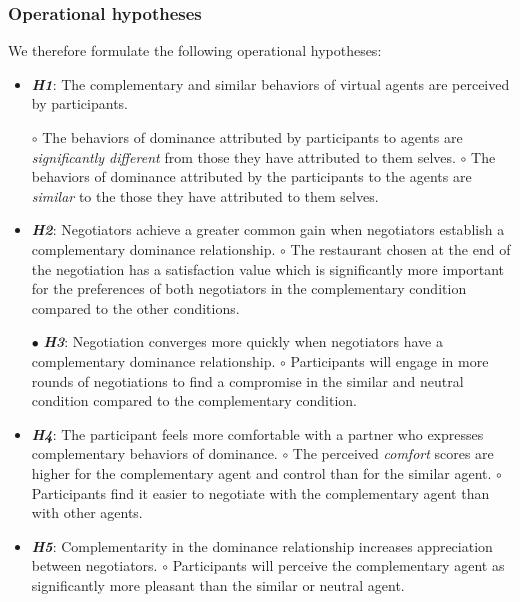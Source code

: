 \documentclass[10pt, a4paper]{article} %
\begin{document}
		\subsubsection{Operational hypotheses}
		We therefore formulate the following operational hypotheses:
		\begin{itemize}
			\item \textit{\textbf{H1}}: The complementary and similar behaviors of virtual agents are perceived by participants.
				
				\subitem $\circ$ The behaviors of dominance attributed by participants to agents are \textit{significantly different} from those they have attributed to them selves.
				\subitem $\circ$ The behaviors of dominance attributed by the participants to the agents are \textit{similar} to the those they have attributed to them selves.
				
				\item \textit{ \textbf{H2}}: Negotiators achieve a greater common gain when negotiators establish a complementary dominance relationship.
					\subitem $\circ$ The restaurant chosen at the end of the negotiation has a satisfaction value which is significantly more important for the preferences of both negotiators in the complementary condition compared to the other conditions. 
					
					\item[$\bullet$] \textit{\textbf{H3}}: Negotiation converges more quickly when negotiators have a complementary dominance relationship.
						\subitem $\circ$ Participants will engage in more rounds of negotiations to find a compromise in the similar and neutral condition compared to the complementary condition.
						
					\item \textit{\textbf{H4}}: The participant feels more comfortable with a partner who expresses complementary behaviors of dominance.
						\subitem $\circ$ The perceived \emph{comfort} scores are higher for the complementary agent and control than for the similar agent.
						\subitem $\circ$ Participants find it easier to negotiate with the complementary agent than with other agents.
						
					\item \textit{\textbf{H5}}: Complementarity in the dominance relationship increases appreciation between negotiators.
						\subitem $\circ$ Participants will perceive the complementary agent as significantly more pleasant than the similar or neutral agent.
								
		\end{itemize}
		
\end{document}
